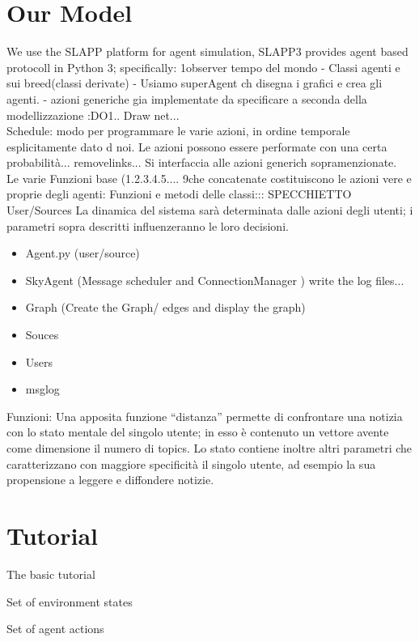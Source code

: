 \documentclass[11pt]{article} %
\begin{document}
\section{Our Model}
We use the SLAPP platform for agent simulation,
SLAPP3 provides agent based protocoll in Python 3; specifically: 1observer tempo del mondo - Classi agenti e sui breed(classi derivate) - Usiamo superAgent ch disegna i grafici e crea gli agenti. - azioni generiche gia implementate da specificare a seconda della modellizzazione :DO1.. Draw net... 
\\
Schedule: modo per programmare le varie azioni, in ordine temporale esplicitamente dato d noi.  Le azioni possono essere performate con una certa probabilità... removelinks...
Si interfaccia alle azioni generich sopramenzionate.
\\
Le varie Funzioni base (1.2.3.4.5....  9che concatenate costituiscono le azioni vere e proprie degli agenti: Funzioni e metodi delle classi::: SPECCHIETTO
User/Sources
La dinamica del sistema sarà determinata dalle azioni degli utenti; i parametri sopra descritti
influenzeranno le loro decisioni.
\begin{itemize}
\item Agent.py   (user/source) 
\item SkyAgent  (Message scheduler and ConnectionManager ) write the log files...
\item Graph (Create the Graph/ edges and display the graph)
\item Souces
\item Users

\item msglog
\end{itemize}
Funzioni:
Una apposita funzione “distanza” permette di confrontare una notizia con lo stato mentale del
singolo utente; in esso è contenuto un vettore avente come dimensione il numero di topics. Lo stato
contiene inoltre altri parametri che caratterizzano con maggiore specificità il singolo utente, ad
esempio la sua propensione a leggere e diffondere notizie.

\section{Tutorial}
The basic tutorial 


 Set of environment states

 Set of agent actions
\end{document}
